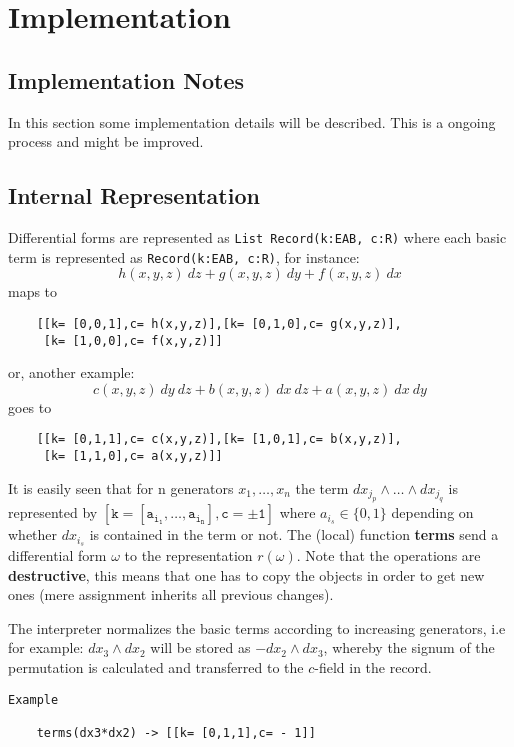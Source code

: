 \documentclass[12pt,a4paper]{article}
\begin{document}
\section{Implementation}
\subsection{Implementation Notes} 
In this section some implementation details will be described. This is a 
ongoing process and might be improved.
\subsection{Internal Representation}
Differential forms are represented as {\tt List Record(k:EAB, c:R)} 
where each basic term is represented as {\tt Record(k:EAB, c:R)}, 
for instance:
\begin{displaymath}
  h (x, y, z)\ dz + g (x, y, z)\ dy + f (x, y, z)\ dx
\end{displaymath}
maps to
\begin{lstlisting}
    [[k= [0,0,1],c= h(x,y,z)],[k= [0,1,0],c= g(x,y,z)],
     [k= [1,0,0],c= f(x,y,z)]]
\end{lstlisting}
or, another example:
\begin{displaymath}
 c (x, y, z)\ dy\ dz + b (x, y, z)\ dx\ dz + a (x, y, z)\ dx\ dy
\end{displaymath}
goes to
\begin{lstlisting}
    [[k= [0,1,1],c= c(x,y,z)],[k= [1,0,1],c= b(x,y,z)],
     [k= [1,1,0],c= a(x,y,z)]]
\end{lstlisting}
It is easily seen that for n generators $x_1, \ldots, x_n$ the term 
$d x_{j_p} \wedge \ldots \wedge d x_{j_q}$ is represented by
$\mathtt{[k = [a_{i_1}, \ldots, a_{i_n}], c = \pm 1]}$
where $a_{i_s} \in \{ 0, 1 \}$ depending on whether 
$d x_{i_s}$ is contained in the term or not. The (local) function 
 {\bf terms} send a differential form $\omega$ to the representation 
$r(\omega)$.
Note that the operations are {\bf destructive}, this means that one has 
to copy the objects in order to get new ones (mere assignment inherits 
all previous changes).

The interpreter normalizes the basic terms according to increasing
generators, i.e for example: $d x_3 \wedge d x_2$ will be stored 
as $- d x_2 \wedge d x_3$, whereby the signum of the permutation is 
calculated and transferred to the $c$-field in the record.
\begin{lstlisting}
Example
  
    terms(dx3*dx2) -> [[k= [0,1,1],c= - 1]]
\end{lstlisting}
%
\end{document}
